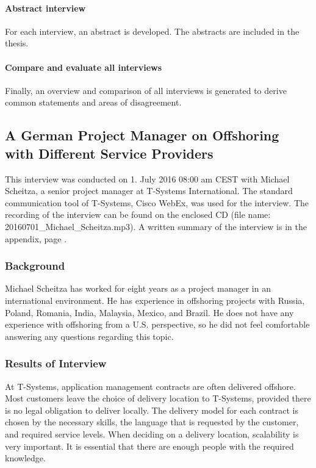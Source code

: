 \paragraph{Abstract interview} For each interview, an abstract is developed. The abstracts are included in the thesis.

\paragraph{Compare and evaluate all interviews} Finally, an overview and comparison of all interviews is generated to derive common statements and areas of disagreement.

\newpage
\subsection{A German Project Manager on Offshoring with Different Service Providers}

This interview was conducted on 1. July 2016 08:00 am CEST with Michael Scheitza, a senior project manager at T-Systems International. The standard communication tool of T-Systems, Cisco WebEx, was used for the interview. The recording of the interview can be found on the enclosed CD (file name: 20160701\_Michael\_Scheitza.mp3). A written summary of the interview is in the appendix, page \pageref{int:Scheitza}.

\subsubsection{Background}
Michael Scheitza has worked for eight years as a project manager in an international environment. He has experience in offshoring projects with Russia, Poland, Romania, India, Malaysia, Mexico, and Brazil. He does not have any experience with offshoring from a U.S. perspective, so he did not feel comfortable answering any questions regarding this topic. 
\subsubsection{Results of Interview}
At T-Systems, application management contracts are often delivered offshore. Most customers leave the choice of delivery location to T-Systems, provided there is no legal obligation to deliver locally. The delivery model for each contract is chosen by the necessary skills, the language that is requested by the customer, and required service levels. When deciding on a delivery location, scalability is very important. It is essential that there are enough people with the required knowledge.

